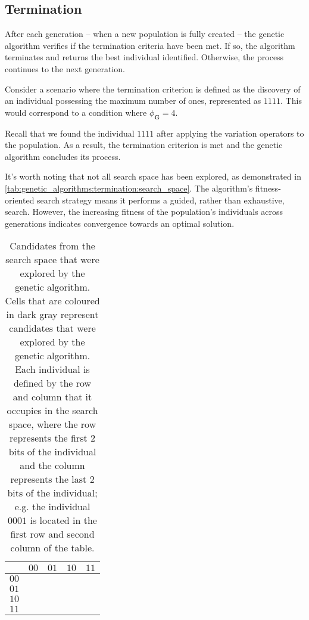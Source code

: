 \subsection{Termination}
\label{sec:genetic_algorithms:termination}
  After each generation -- when a new population is fully created -- the
  genetic algorithm verifies if the termination criteria have been met.
  If so, the algorithm terminates and returns the best individual identified.
  Otherwise, the process continues to the next generation.

  Consider a scenario where the termination criterion is defined as the 
  discovery of an individual possessing the maximum number of ones, represented 
  as $1111$.
  This would correspond to a condition where $\phi_\mathbf{G} = 4$.

  Recall that we found the individual $1111$ after applying the variation 
  operators to the population. 
  As a result, the termination criterion is met and the genetic algorithm 
  concludes its process.

  It's worth noting that not all search space has been explored, as demonstrated 
  in \vref{tab:genetic_algorithms:termination:search_space}.
  The algorithm's fitness-oriented search strategy means it performs a guided, 
  rather than exhaustive, search. 
  However, the increasing fitness of the population's individuals across 
  generations indicates convergence towards an optimal solution.
  
  \begin{table}[ht!]
    \centering
    \begin{tabular}{|c||c|c|c|c|}
      \hline
            & $00$ & $01$ & $10$ & $11$ \\
      \hline
      \hline
      $00$  & \cellcolor{darkgray}  & \cellcolor{darkgray} 
        & \cellcolor{darkgray}  & \\
      \hline
      $01$  & \cellcolor{darkgray}  & \cellcolor{darkgray}  
        &                       & \\
      \hline
      $10$  &                       &                       
        & \cellcolor{darkgray}  & \\
      \hline
      $11$  & \cellcolor{darkgray}  & \cellcolor{darkgray}  
        &                       & \cellcolor{darkgray} \\
      \hline
    \end{tabular}
    \caption{
      Candidates from the search space that were explored by the genetic 
      algorithm.
      Cells that are coloured in dark gray represent candidates that were
      explored by the genetic algorithm.
      Each individual is defined by the row and column that it occupies in the
      search space, where the row represents the first 2 bits of the individual
      and the column represents the last 2 bits of the individual; e.g. the
      individual $0001$ is located in the first row and second column of the
      table.
    }
    \label{tab:genetic_algorithms:termination:search_space}
  \end{table}

